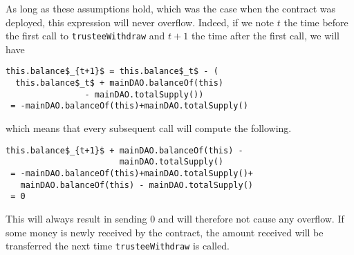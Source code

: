 As long as these assumptions hold, which was the case when the contract was deployed, this expression will never overflow. Indeed, if we note $t$ the time before the first call to \lstinline{trusteeWithdraw} and $t + 1$ the time after the first call, we will have
\begin{lstlisting}
this.balance$_{t+1}$ = this.balance$_t$ - (
  this.balance$_t$ + mainDAO.balanceOf(this)
                - mainDAO.totalSupply())
 = -mainDAO.balanceOf(this)+mainDAO.totalSupply()
\end{lstlisting}


which means that every subsequent call will compute the following.

\begin{lstlisting}
this.balance$_{t+1}$ + mainDAO.balanceOf(this) -
                       mainDAO.totalSupply()
 = -mainDAO.balanceOf(this)+mainDAO.totalSupply()+
   mainDAO.balanceOf(this) - mainDAO.totalSupply()
 = 0
\end{lstlisting}


This will always result in sending $0$ and will therefore not cause any overflow. If some money is newly received by the contract, the amount received will be transferred the next time \lstinline{trusteeWithdraw} is called.
